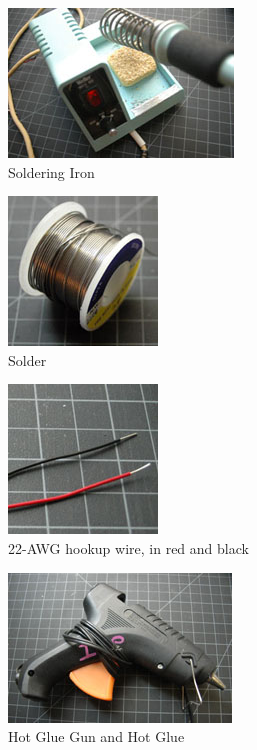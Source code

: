 \begin{figure}[!htb]
     \centering
     \includegraphics[scale=0.3]{img/soldering/soldering_iron.jpg}
     \caption{Soldering Iron}
     \label{Soldering Iron}
\end{figure}

\begin{figure}[!htb]
     \centering
     \includegraphics[scale=0.3]{img/soldering/solder.jpg}
     \caption{Solder}
     \label{Solder}
\end{figure}

\begin{figure}[!htb]
     \centering
     \includegraphics[scale=0.3]{img/soldering/hookup_wire.jpg}
     \caption{22-AWG hookup wire, in red and black}
     \label{22-AWG hookup wire, in red and black}
\end{figure}

\begin{figure}[!htb]
     \centering
     \includegraphics[scale=0.3]{img/soldering/hot_glue_gun.jpg}
     \caption{Hot Glue Gun and Hot Glue}
     \label{Hot Glue Gun and Hot Glue}
\end{figure}

